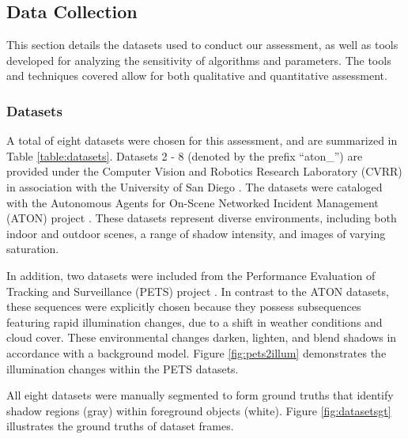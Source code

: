 \subsection{Data Collection}  \label{section:datacollection}

This section details the datasets used to conduct our assessment, as well as tools developed for analyzing the sensitivity of algorithms and parameters. The tools and techniques covered allow for both qualitative and quantitative assessment.

\subsubsection{Datasets}

A total of eight datasets were chosen for this assessment, and are summarized in Table \ref{table:datasets}. Datasets 2 - 8 (denoted by the prefix ``aton\_'') are provided under the Computer Vision and Robotics Research Laboratory (CVRR) in association with the University of San Diego \cite{cvrr}. The datasets were cataloged with the Autonomous Agents for On-Scene Networked Incident Management (ATON) project \cite{aton2002}. These datasets represent diverse environments, including both indoor and outdoor scenes, a range of shadow intensity, and images of varying saturation.

In addition, two datasets were included from the Performance Evaluation of Tracking and Surveillance (PETS) project \cite{pets2001}. In contrast to the ATON datasets, these sequences were explicitly chosen because they possess subsequences featuring rapid illumination changes, due to a shift in weather conditions and cloud cover. These environmental changes darken, lighten, and blend shadows in accordance with a background model. Figure \ref{fig:pets2illum} demonstrates the illumination changes within the PETS datasets.

All eight datasets were manually segmented to form ground truths that identify shadow regions (gray) within foreground objects (white). Figure \ref{fig:datasetsgt} illustrates the ground truths of dataset frames.


